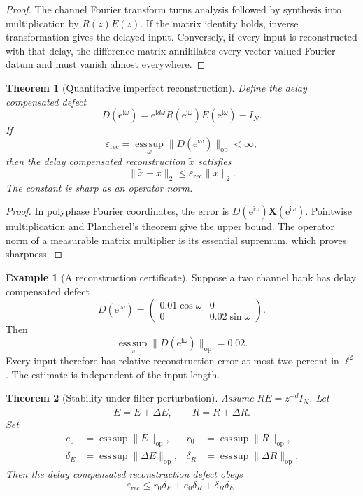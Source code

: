 \documentclass{aomart}
\newtheorem{theorem}{Theorem}[section]
\theoremstyle{definition}
\newtheorem{example}[example]{Example}
\theoremstyle{remark}
\newcommand{\esssup}{\operatorname*{ess\,sup}}
\newcommand{\e}{\mathrm e}
\newcommand{\ii}{\mathrm i}
\begin{document}
\begin{proof}
The channel Fourier transform turns analysis followed by synthesis into multiplication by \(R(z)E(z)\). If the matrix identity holds, inverse transformation gives the delayed input. Conversely, if every input is reconstructed with that delay, the difference matrix annihilates every vector valued Fourier datum and must vanish almost everywhere.
\end{proof}

\begin{theorem}[Quantitative imperfect reconstruction]\label{thm:imperfect_reconstruction}
Define the delay compensated defect
\[
D(\e^{\ii\omega})
=
\e^{\ii d\omega}R(\e^{\ii\omega})E(\e^{\ii\omega})-I_N.
\]
If
\[
\varepsilon_{\mathrm{rec}}
=
\esssup_{\omega}\|D(\e^{\ii\omega})\|_{\mathrm{op}}<\infty,
\]
then the delay compensated reconstruction \(\widetilde x\) satisfies
\[
\|\widetilde x-x\|_2
\leq
\varepsilon_{\mathrm{rec}}\|x\|_2.
\]
The constant is sharp as an operator norm.
\end{theorem}

\begin{proof}
In polyphase Fourier coordinates, the error is \(D(\e^{\ii\omega})\bm X(\e^{\ii\omega})\). Pointwise multiplication and Plancherel's theorem give the upper bound. The operator norm of a measurable matrix multiplier is its essential supremum, which proves sharpness.
\end{proof}

\begin{example}[A reconstruction certificate]\label{ex:reconstruction_certificate}
Suppose a two channel bank has delay compensated defect
\[
D(\e^{\ii\omega})
=
\begin{pmatrix}
0.01\cos\omega&0\\
0&0.02\sin\omega
\end{pmatrix}.
\]
Then
\[
\esssup_\omega\|D(\e^{\ii\omega})\|_{\mathrm{op}}
=0.02.
\]
Every input therefore has relative reconstruction error at most two percent in \(\ell^2\). The estimate is independent of the input length.
\end{example}

\begin{theorem}[Stability under filter perturbation]\label{thm:filter_perturbation}
Assume \(RE=z^{-d}I_N\). Let
\[
\widetilde E=E+\Delta E,
\qquad
\widetilde R=R+\Delta R.
\]
Set
\[
\begin{aligned}
e_0&=\esssup\|E\|_{\mathrm{op}},
& r_0&=\esssup\|R\|_{\mathrm{op}},\\
\delta_E&=\esssup\|\Delta E\|_{\mathrm{op}},
& \delta_R&=\esssup\|\Delta R\|_{\mathrm{op}}.
\end{aligned}
\]
Then the delay compensated reconstruction defect obeys
\[
\varepsilon_{\mathrm{rec}}
\leq
r_0\delta_E+e_0\delta_R+\delta_R\delta_E.
\]
\end{theorem}
\end{document}
